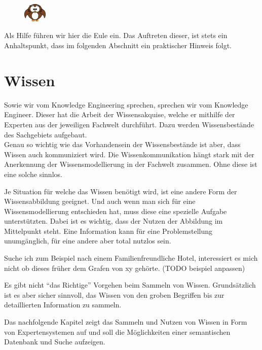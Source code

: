 \vspace{10pt}
\begin{figure}
    \vspace{-19pt}
    \includegraphics[width=0.1\textwidth]{bilder/owl.png}
\end{figure}
Als Hilfe führen wir hier die Eule ein. Das Auftreten dieser, ist stets ein Anhaltspunkt, dass im folgenden Abschnitt ein praktischer Hinweis folgt.


\section{Wissen}
\label{chap:einleitung_wissen}


Sowie wir vom Knowledge Engineering sprechen, sprechen wir vom Knowledge Engineer. Dieser hat die Arbeit der Wissensakquise, welche er mithilfe der Experten aus der jeweiligen Fachwelt durchführt. Dazu werden Wissensbestände des Sachgebiets aufgebaut. \\
Genau so wichtig wie das Vorhandensein der Wissensbestände ist aber, dass Wissen auch kommuniziert wird. Die Wissenkommunikation hängt stark mit der Anerkennung der Wissensmodellierung in der Fachwelt zusammen. Ohne diese ist eine solche sinnlos.
 
Je Situation für welche das Wissen benötigt wird, ist eine andere Form der Wissensabbildung geeignet. Und auch wenn man sich für eine Wissensmodellierung entschieden hat, muss diese eine spezielle Aufgabe unterstützten. Dabei ist es wichtig, dass der Nutzen der Abbildung im Mittelpunkt steht. Eine Information kann für eine Problemstellung unumgänglich, für eine andere aber total nutzlos sein.

\noindent\hspace*{15mm}Suche ich zum Beispiel nach einem Familienfreundliche Hotel, interessiert es mich nicht ob dieses früher dem Grafen von xy gehörte. (TODO beispiel anpassen)

Es gibt nicht ``das Richtige'' Vorgehen beim Sammeln von Wissen. Grundsätzlich ist es aber sicher sinnvoll, das Wissen von den groben Begriffen bis zur detaillierten Information zu sammeln.

Das nachfolgende Kapitel zeigt das Sammeln und Nutzen von Wissen in Form von Expertensystemen auf und soll die Möglichkeiten einer semantischen Datenbank und Suche aufzeigen.
